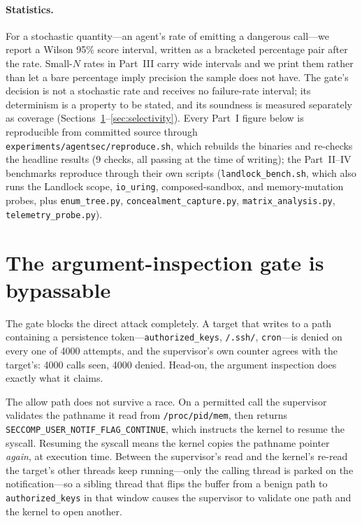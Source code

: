 \documentclass[11pt]{article}
\newcommand{\Nrace}{4000}
\begin{document}
\paragraph{Statistics.} For a stochastic quantity---an agent's rate of emitting a dangerous
call---we report a Wilson 95\% score interval, written as a bracketed percentage pair after the rate.
Small-$N$ rates in Part~III carry wide intervals and we print them rather than let a bare percentage
imply precision the sample does not have. The gate's decision is not a stochastic rate and receives
no failure-rate interval; its determinism is a property to be stated, and its soundness is measured
separately as coverage (Sections~\ref{sec:toctou}--\ref{sec:selectivity}). Every Part~I figure below is
reproducible from committed source through \texttt{experiments/agentsec/reproduce.sh}, which rebuilds the
binaries and re-checks the headline results (9 checks, all passing at the time of writing); the Part~II--IV
benchmarks reproduce through their own scripts (\texttt{landlock\_bench.sh}, which also runs
the Landlock scope, \texttt{io\_uring}, composed-sandbox, and memory-mutation probes, plus \texttt{enum\_tree.py},
\texttt{concealment\_capture.py}, \texttt{matrix\_analysis.py}, \texttt{telemetry\_probe.py}).

\section{The argument-inspection gate is bypassable}\label{sec:toctou}

The gate blocks the direct attack completely. A target that writes to a path containing a
persistence token---\texttt{authorized\_keys}, \texttt{/.ssh/}, \texttt{cron}---is denied on every
one of \Nrace{} attempts, and the supervisor's own counter agrees with the target's: \Nrace{} calls
seen, \Nrace{} denied. Head-on, the argument inspection does exactly what it claims.

The allow path does not survive a race. On a permitted call the supervisor validates the pathname it
read from \texttt{/proc/pid/mem}, then returns \texttt{SECCOMP\_USER\_NOTIF\_FLAG\_CONTINUE}, which
instructs the kernel to resume the syscall. Resuming the syscall means the kernel copies the pathname
pointer \emph{again}, at execution time. Between the supervisor's read and the kernel's re-read the
target's other threads keep running---only the calling thread is parked on the notification---so a
sibling thread that flips the buffer from a benign path to \texttt{authorized\_keys} in that window
causes the supervisor to validate one path and the kernel to open another.
\end{document}
